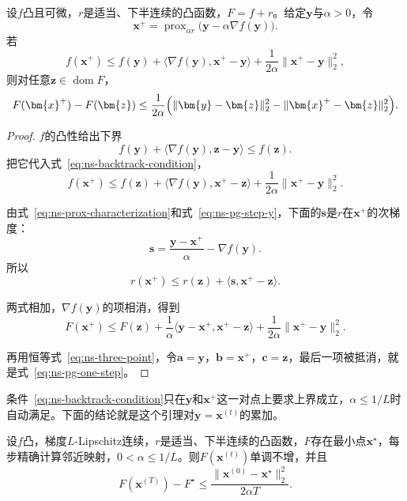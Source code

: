 \begin{lemma}[邻近梯度的一步不等式]
\label{lem:ns-pg-one-step}
设$f$凸且可微，$r$是适当、下半连续的凸函数，$F=f+r$。给定$\bm{y}$与$\alpha>0$，令
\begin{equation}
 \bm{x}^{+}=\operatorname{prox}_{\alpha r}\bigl(\bm{y}-\alpha\nabla f(\bm{y})\bigr).
 \label{eq:ns-pg-step-y}
\end{equation}
若
\begin{equation}
 f(\bm{x}^{+})\leq f(\bm{y})+\langle\nabla f(\bm{y}),\bm{x}^{+}-\bm{y}\rangle+\frac{1}{2\alpha}\lVert\bm{x}^{+}-\bm{y}\rVert_2^2,
 \label{eq:ns-backtrack-condition}
\end{equation}
则对任意$\bm{z}\in\operatorname{dom}F$，
\begin{equation}
 F(\bm{x}^{+})-F(\bm{z})\leq\frac{1}{2\alpha}\Bigl(\lVert\bm{y}-\bm{z}\rVert_2^2-\lVert\bm{x}^{+}-\bm{z}\rVert_2^2\Bigr).
 \label{eq:ns-pg-one-step}
\end{equation}
\end{lemma}

\begin{proof}
$f$的凸性给出下界
\[
 f(\bm{y})+\langle\nabla f(\bm{y}),\bm{z}-\bm{y}\rangle\leq f(\bm{z}).
\]
把它代入式~\eqref{eq:ns-backtrack-condition}，
\[
 f(\bm{x}^{+})\leq f(\bm{z})+\langle\nabla f(\bm{y}),\bm{x}^{+}-\bm{z}\rangle+\frac{1}{2\alpha}\lVert\bm{x}^{+}-\bm{y}\rVert_2^2.
\]

由式~\eqref{eq:ns-prox-characterization}和式~\eqref{eq:ns-pg-step-y}，下面的$\bm{s}$是$r$在$\bm{x}^{+}$的次梯度：
\[
 \bm{s}=\frac{\bm{y}-\bm{x}^{+}}{\alpha}-\nabla f(\bm{y}).
\]
所以
\[
 r(\bm{x}^{+})\leq r(\bm{z})+\langle\bm{s},\bm{x}^{+}-\bm{z}\rangle.
\]

两式相加，$\nabla f(\bm{y})$的项相消，得到
\[
 F(\bm{x}^{+})\leq F(\bm{z})+\frac{1}{\alpha}\langle\bm{y}-\bm{x}^{+},\bm{x}^{+}-\bm{z}\rangle+\frac{1}{2\alpha}\lVert\bm{x}^{+}-\bm{y}\rVert_2^2.
\]

再用恒等式~\eqref{eq:ns-three-point}，令$\bm{a}=\bm{y}$，$\bm{b}=\bm{x}^{+}$，$\bm{c}=\bm{z}$，最后一项被抵消，就是式~\eqref{eq:ns-pg-one-step}。
\end{proof}

条件~\eqref{eq:ns-backtrack-condition}只在$\bm{y}$和$\bm{x}^{+}$这一对点上要求上界成立，$\alpha\leq1/L$时自动满足。下面的结论就是这个引理对$\bm{y}=\bm{x}^{(t)}$的累加。

\begin{theorem}[邻近梯度法的收敛速率]
\label{thm:ns-pg-rate}
设$f$凸，梯度$L$-Lipschitz连续，$r$是适当、下半连续的凸函数，$F$存在最小点$\bm{x}^\star$，每步精确计算邻近映射，$0<\alpha\leq1/L$。则$F(\bm{x}^{(t)})$单调不增，并且
\begin{equation}
 F(\bm{x}^{(T)})-F^\star\leq\frac{\lVert\bm{x}^{(0)}-\bm{x}^\star\rVert_2^2}{2\alpha T}.
 \label{eq:ns-pg-rate}
\end{equation}
\end{theorem}

